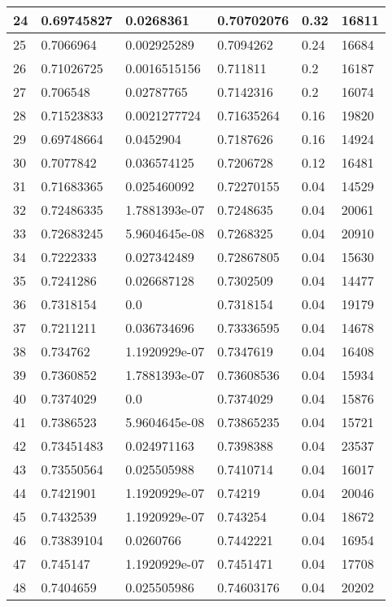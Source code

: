 \begin{longtable}{|l|l|l|l|l|l|}
24 & 0.69745827 & 0.0268361 & 0.70702076 & 0.32 & 16811 \\ \hline 
25 & 0.7066964 & 0.002925289 & 0.7094262 & 0.24 & 16684 \\ \hline 
26 & 0.71026725 & 0.0016515156 & 0.711811 & 0.2 & 16187 \\ \hline 
27 & 0.706548 & 0.02787765 & 0.7142316 & 0.2 & 16074 \\ \hline 
28 & 0.71523833 & 0.0021277724 & 0.71635264 & 0.16 & 19820 \\ \hline 
29 & 0.69748664 & 0.0452904 & 0.7187626 & 0.16 & 14924 \\ \hline 
30 & 0.7077842 & 0.036574125 & 0.7206728 & 0.12 & 16481 \\ \hline 
31 & 0.71683365 & 0.025460092 & 0.72270155 & 0.04 & 14529 \\ \hline 
32 & 0.72486335 & 1.7881393e-07 & 0.7248635 & 0.04 & 20061 \\ \hline 
33 & 0.72683245 & 5.9604645e-08 & 0.7268325 & 0.04 & 20910 \\ \hline 
34 & 0.7222333 & 0.027342489 & 0.72867805 & 0.04 & 15630 \\ \hline 
35 & 0.7241286 & 0.026687128 & 0.7302509 & 0.04 & 14477 \\ \hline 
36 & 0.7318154 & 0.0 & 0.7318154 & 0.04 & 19179 \\ \hline 
37 & 0.7211211 & 0.036734696 & 0.73336595 & 0.04 & 14678 \\ \hline 
38 & 0.734762 & 1.1920929e-07 & 0.7347619 & 0.04 & 16408 \\ \hline 
39 & 0.7360852 & 1.7881393e-07 & 0.73608536 & 0.04 & 15934 \\ \hline 
40 & 0.7374029 & 0.0 & 0.7374029 & 0.04 & 15876 \\ \hline 
41 & 0.7386523 & 5.9604645e-08 & 0.73865235 & 0.04 & 15721 \\ \hline 
42 & 0.73451483 & 0.024971163 & 0.7398388 & 0.04 & 23537 \\ \hline 
43 & 0.73550564 & 0.025505988 & 0.7410714 & 0.04 & 16017 \\ \hline 
44 & 0.7421901 & 1.1920929e-07 & 0.74219 & 0.04 & 20046 \\ \hline 
45 & 0.7432539 & 1.1920929e-07 & 0.743254 & 0.04 & 18672 \\ \hline 
46 & 0.73839104 & 0.0260766 & 0.7442221 & 0.04 & 16954 \\ \hline 
47 & 0.745147 & 1.1920929e-07 & 0.7451471 & 0.04 & 17708 \\ \hline 
48 & 0.7404659 & 0.025505986 & 0.74603176 & 0.04 & 20202 \\ \hline 

\end{longtable}
